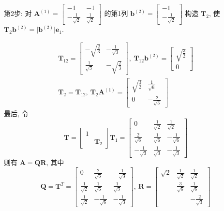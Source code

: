 \par 第2步: 对 $\bm{A}^{(1)} = \begin{bmatrix}
        -1                  & -1                 \\
        -\frac{1}{\sqrt{2}} & \frac{1}{\sqrt{2}}
    \end{bmatrix}$ 的第1列 $\bm{b}^{(2)} = \begin{bmatrix}
        -1 \\
        -\frac{1}{\sqrt{2}}
    \end{bmatrix}$ 构造 $\bm{T}_2$, 使 $\bm{T}_2\bm{b}^{(2)} = \lvert \bm{b}^{(2)} \rvert \bm{e}_1$.

\begin{gather*}
    \bm{T}_{12} = \begin{bmatrix}
        -\sqrt{\frac{2}{3}} & -\frac{1}{\sqrt{3}} \\
        \frac{1}{\sqrt{3}}  & -\sqrt{\frac{2}{3}}
    \end{bmatrix}, \ \bm{T}_{12}\bm{b}^{(2)} = \begin{bmatrix}
        \sqrt{\frac{3}{2}} \\
        0
    \end{bmatrix} \\
    \bm{T}_2 = \bm{T}_{12},\ \bm{T}_2\bm{A}^{(1)} = \begin{bmatrix}
        \sqrt{\frac{3}{2}} & \frac{1}{\sqrt{6}}  \\
        0                  & -\frac{2}{\sqrt{3}}
    \end{bmatrix}
\end{gather*}
最后, 令
$$
    \bm{T} = \begin{bmatrix}
        1 &          \\
          & \bm{T}_2
    \end{bmatrix} \bm{T}_1 = \begin{bmatrix}
        0                   & \frac{1}{\sqrt{2}} & \frac{1}{\sqrt{2}}  \\
        \frac{2}{\sqrt{6}}  & \frac{1}{\sqrt{6}} & -\frac{1}{\sqrt{6}} \\
        -\frac{1}{\sqrt{3}} & \frac{1}{\sqrt{3}} & -\frac{1}{\sqrt{3}}
    \end{bmatrix}
$$
则有 $\bm{A} = \bm{QR}$, 其中
$$
    \bm{Q} = \bm{T}^{T} = \begin{bmatrix}
        0                  & \frac{2}{\sqrt{6}}  & -\frac{1}{\sqrt{3}} \\
        \frac{1}{\sqrt{2}} & \frac{1}{\sqrt{6}}  & \frac{1}{\sqrt{3}}  \\
        \frac{1}{\sqrt{2}} & -\frac{1}{\sqrt{6}} & -\frac{1}{\sqrt{3}}
    \end{bmatrix}, \ \bm{R} =\begin{bmatrix}
        \sqrt{2} & \frac{1}{\sqrt{2}} & \frac{1}{\sqrt{2}}  \\
                 & \frac{3}{\sqrt{6}} & \frac{1}{\sqrt{6}}  \\
                 &                    & -\frac{2}{\sqrt{3}}
    \end{bmatrix}
$$

